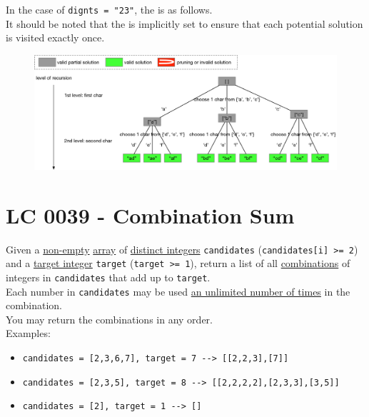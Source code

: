 In the case of {\colorbox{CodeBackground}{\lstinline|dignts = "23"|}}, the {\color{blue}{potential search tree}} is as follows. \\

It should be noted that the {\color{blue}{search order}} is implicitly set to ensure that each potential solution is visited exactly once.
\begin{figure}[H]
	\centering
	\includegraphics[width=1.0\linewidth]{images/lc0017_pst}
	\label{fig:lc0017pst}
\end{figure}

\section{LC 0039 - Combination Sum}\label{lc0039}
Given a \ul{non-empty} \ul{array} of \ul{distinct integers} {\colorbox{CodeBackground}{\lstinline|candidates|}} ({\colorbox{CodeBackground}{\lstinline|candidates[i] >= 2|}}) and a \ul{target integer} {\colorbox{CodeBackground}{\lstinline|target|}} ({\colorbox{CodeBackground}{\lstinline|target >= 1|}}), return a list of all \ul{combinations} of integers in {\colorbox{CodeBackground}{\lstinline|candidates|}} that add up to {\colorbox{CodeBackground}{\lstinline|target|}}.\\

Each number in {\colorbox{CodeBackground}{\lstinline|candidates|}} may be used \ul{an unlimited number of times} in the combination.\\

You may return the combinations in any order.\\

Examples:
\begin{itemize}
	\item {\colorbox{CodeBackground}{\lstinline|candidates = [2,3,6,7], target = 7 --> [[2,2,3],[7]]|}}
	\item {\colorbox{CodeBackground}{\lstinline|candidates = [2,3,5], target = 8 --> [[2,2,2,2],[2,3,3],[3,5]]|}}
	\item {\colorbox{CodeBackground}{\lstinline|candidates = [2], target = 1 --> []|}}
\end{itemize}

